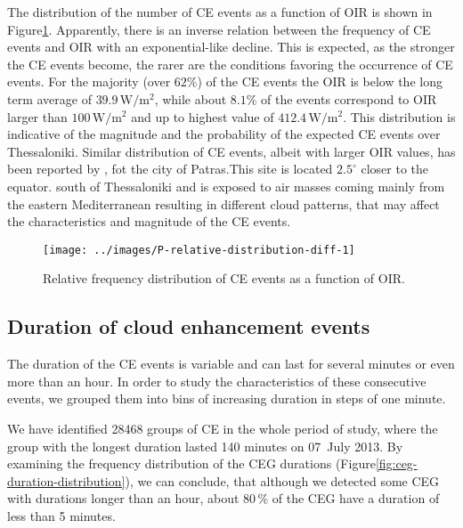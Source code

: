 \documentclass[preprint, 5p,
authoryear]{elsarticle} %
\begin{document}
The distribution of the number of CE events as a function of OIR is
shown in Figure\nobreakspace{}\ref{fig:ovir-distribution}. Apparently,
there is an inverse relation between the frequency of CE events and OIR
with an exponential-like decline. This is expected, as the stronger the
CE events become, the rarer are the conditions favoring the occurrence
of CE events. For the majority (over \(62\%\)) of the CE events the OIR
is below the long term average of \(39.9\,\text{W}/\text{m}^2\), while
about \(8.1\%\) of the events correspond to OIR larger than
\(100\,\text{W}/\text{m}^2\) and up to highest value of
\(412.4\,\text{W}/\text{m}^2\). This distribution is indicative of the
magnitude and the probability of the expected CE events over
Thessaloniki. Similar distribution of CE events, albeit with larger OIR
values, has been reported by \citet{Vamvakas2020}, fot the city of
Patras.This site is located \(2.5^\circ\) closer to the equator. south
of Thessaloniki and is exposed to air masses coming mainly from the
eastern Mediterranean resulting in different cloud patterns, that may
affect the characteristics and magnitude of the CE events.

\begin{figure}

{\centering \texttt{[image: ../images/P-relative-distribution-diff-1]} 

}

\caption{Relative frequency distribution of CE events as a function of OIR.}\label{fig:ovir-distribution}
\end{figure}

\hypertarget{duration-of-cloud-enhancement-events}{%
\subsection{Duration of cloud enhancement
events}\label{duration-of-cloud-enhancement-events}}

The duration of the CE events is variable and can last for several
minutes or even more than an hour. In order to study the characteristics
of these consecutive events, we grouped them into bins of increasing
duration in steps of one minute.

We have identified 28468 groups of CE in the whole period of study,
where the group with the longest duration lasted 140 minutes on 07~July
2013. By examining the frequency distribution of the CEG durations
(Figure\nobreakspace{}\ref{fig:ceg-duration-distribution}), we can
conclude, that although we detected some CEG with durations longer than
an hour, about \(80\,\%\) of the CEG have a duration of less than 5
minutes.
\end{document}
